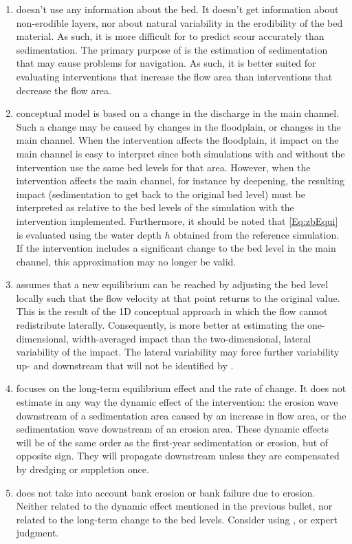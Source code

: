 \begin{enumerate}
\item \dfastmi doesn't use any information about the bed.
It doesn't get information about non-erodible layers, nor about natural variability in the erodibility of the bed material.
As such, it is more difficult for \dfmi to predict scour accurately than sedimentation.
The primary purpose of \dfmi is the estimation of sedimentation that may cause problems for navigation.
As such, it is better suited for evaluating interventions that increase the flow area than interventions that decrease the flow area.

\item \dfastmi conceptual model is based on a change in the discharge in the main channel.
Such a change may be caused by changes in the floodplain, or changes in the main channel.
When the intervention affects the floodplain, it impact on the main channel is easy to interpret since both simulations with and without the intervention use the same bed levels for that area.
However, when the intervention affects the main channel, for instance by deepening, the resulting impact (sedimentation to get back to the original bed level) must be interpreted as relative to the bed levels of the simulation with the intervention implemented.
Furthermore, it should be noted that \autoref{Eq:zbEqui} is evaluated using the water depth $h$ obtained from the reference simulation.
If the intervention includes a significant change to the bed level in the main channel, this approximation may no longer be valid.

\item \dfastmi assumes that a new equilibrium can be reached by adjusting the bed level locally such that the flow velocity at that point returns to the original value.
This is the result of the 1D conceptual approach in which the flow cannot redistribute laterally.
Consequently, \dfmi is more better at estimating the one-dimensional, width-averaged impact than the two-dimensional, lateral variability of the impact.
The lateral variability may force further variability up- and downstream that will not be identified by \dfmi.

\item \dfastmi focuses on the long-term equilibrium effect and the rate of change.
It does not estimate in any way the dynamic effect of the intervention: the erosion wave downstream of a sedimentation area caused by an increase in flow area, or the sedimentation wave downstream of an erosion area.
These dynamic effects will be of the same order as the first-year sedimentation or erosion, but of opposite sign.
They will propagate downstream unless they are compensated by dredging or suppletion once.

\item \dfastmi does not take into account bank erosion or bank failure due to erosion.
Neither related to the dynamic effect mentioned in the previous bullet, nor related to the long-term change to the bed levels.
Consider using \dfastbe, or expert judgment.

\end{enumerate}
